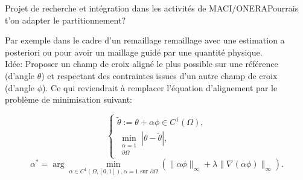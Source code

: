 \documentclass[compress,10pt,aspectratio=169]{beamer}
\begin{document}
\begin{frame}{\large Projet de recherche et intégration dans les activités de MACI/ONERA}{Pourrais t'on adapter le partitionnement?}

\small
Par exemple dans le cadre d'un remaillage remaillage avec une estimation a posteriori ou pour avoir un maillage guidé par une quantité physique.\\\vspace{0.3cm}
Idée: Proposer un champ de croix aligné le plus possible sur une référence (d’angle $\theta$) et respectant des contraintes issues d’un autre champ de croix (d’angle $\phi$). Ce qui reviendrait à remplacer l'équation d'alignement par le problème de minimisation suivant:\\\vspace{0.3cm}

\begin{equation*}
\begin{cases}
    \tilde{\theta} := \theta + \alpha\phi \in C^1(\Omega), \\
    \min_{\substack{\alpha=1 \\ \partial\Omega}} \left\lvert \theta - \tilde{\theta} \right\rvert,
\end{cases}
\end{equation*}
$$
\alpha^* = \arg\min_{\alpha\in C^1(\Omega,[0,1]), \alpha=1 \text{ sur } \partial\Omega} \left( \lVert \alpha\phi \rVert_\infty + \lambda \lVert \nabla (\alpha\phi) \rVert_\infty \right).
$$
\end{frame}
\end{document}
